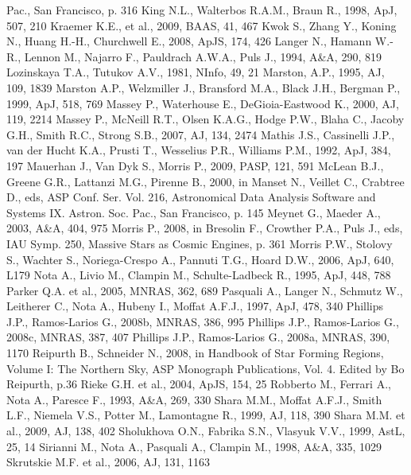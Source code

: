 \documentclass[useAMS]{mn2e}
\begin{document}
\begin{thebibliography}{}
Pac., San Francisco, p. 316
\bibitem{} King N.L., Walterbos R.A.M., Braun R., 1998, ApJ, 507, 210
\bibitem{} Kraemer K.E., et al., 2009, BAAS, 41, 467
\bibitem{} Kwok S., Zhang Y., Koning N., Huang H.-H., Churchwell E., 2008, ApJS, 174, 426
\bibitem{} Langer N., Hamann W.-R., Lennon M., Najarro F., Pauldrach A.W.A., Puls J., 1994, A\&A, 290, 819
\bibitem{} Lozinskaya T.A., Tutukov A.V., 1981, NInfo, 49, 21
\bibitem{} Marston, A.P., 1995, AJ, 109, 1839
\bibitem{} Marston A.P., Welzmiller J., Bransford M.A., Black J.H., Bergman P., 1999, ApJ, 518, 769
\bibitem{} Massey P., Waterhouse E., DeGioia-Eastwood K., 2000, AJ, 119, 2214
\bibitem{} Massey P., McNeill R.T., Olsen K.A.G., Hodge P.W., Blaha C., Jacoby G.H., Smith R.C., Strong
S.B., 2007, AJ, 134, 2474
\bibitem{} Mathis J.S., Cassinelli J.P., van der Hucht K.A., Prusti T., Wesselius P.R., Williams
P.M., 1992, ApJ, 384, 197
\bibitem{} Mauerhan J., Van Dyk S., Morris P., 2009, PASP, 121, 591
\bibitem{} McLean B.J., Greene G.R., Lattanzi M.G., Pirenne B., 2000, in Manset N., Veillet C., Crabtree D.,
eds, ASP Conf. Ser. Vol. 216, Astronomical Data Analysis Software
and Systems IX. Astron. Soc. Pac., San Francisco, p. 145
\bibitem{} Meynet G., Maeder A., 2003, A\&A, 404, 975
\bibitem{} Morris P., 2008, in Bresolin F., Crowther P.A., Puls J., eds, IAU Symp. 250, Massive Stars as Cosmic
Engines, p. 361
\bibitem{} Morris P.W., Stolovy S., Wachter S., Noriega-Crespo A., Pannuti T.G., Hoard
D.W., 2006, ApJ, 640, L179
\bibitem{} Nota A., Livio M., Clampin M., Schulte-Ladbeck R., 1995, ApJ, 448, 788
\bibitem{} Parker Q.A. et al., 2005, MNRAS, 362, 689
\bibitem{} Pasquali A., Langer N., Schmutz W., Leitherer C., Nota A., Hubeny I., Moffat
A.F.J., 1997, ApJ, 478, 340
\bibitem{} Phillips J.P., Ramos-Larios G., 2008b, MNRAS, 386, 995
\bibitem{} Phillips J.P., Ramos-Larios G., 2008c, MNRAS, 387, 407
\bibitem{} Phillips J.P., Ramos-Larios G., 2008a, MNRAS, 390, 1170
\bibitem{} Reipurth B., Schneider N., 2008, in Handbook of Star Forming Regions, Volume I: The Northern
Sky, ASP Monograph Publications, Vol. 4. Edited by Bo Reipurth, p.36
\bibitem{} Rieke G.H. et al., 2004, ApJS, 154, 25
\bibitem{} Robberto M., Ferrari A., Nota A., Paresce F., 1993, A\&A, 269, 330
\bibitem{} Shara M.M., Moffat A.F.J., Smith L.F., Niemela V.S., Potter M., Lamontagne R., 1999, AJ, 118, 390
\bibitem{} Shara M.M. et al., 2009, AJ, 138, 402
\bibitem{} Sholukhova O.N., Fabrika S.N., Vlasyuk V.V., 1999, AstL, 25, 14
\bibitem{} Sirianni M., Nota A., Pasquali A., Clampin M., 1998, A\&A, 335, 1029
\bibitem{} Skrutskie M.F. et al., 2006, AJ, 131, 1163

\end{thebibliography}
\end{document}
